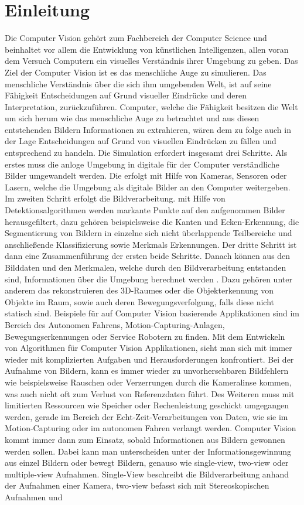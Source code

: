 \chapter{Einleitung}
\label{sec:einleitung} 



Die Computer Vision gehört zum Fachbereich der Computer Science und beinhaltet vor allem die Entwicklung von künstlichen Intelligenzen, allen voran dem Versuch Computern ein visuelles Verständnis ihrer Umgebung zu geben. Das Ziel der Computer Vision ist es das menschliche Auge zu simulieren. Das menschliche Verständnis über die sich ihm umgebenden Welt, ist auf seine Fähigkeit Entscheidungen auf Grund visueller Eindrücke und deren Interpretation, zurückzuführen. Computer, welche die Fähigkeit besitzen die Welt um sich herum wie das menschliche Auge zu betrachtet und aus diesen entstehenden Bildern Informationen zu extrahieren, wären dem zu folge auch in der Lage Entscheidungen auf Grund von visuellen Eindrücken zu fällen und entsprechend zu handeln\cite{ComputerVision}. Die Simulation erfordert insgesamt drei Schritte. Als erstes muss die anloge Umgebung in digitale für der Computer verständliche Bilder umgewandelt werden. Die erfolgt mit Hilfe von Kameras, Sensoren oder Lasern, welche die Umgebung als digitale Bilder an den Computer weitergeben. Im zweiten Schritt erfolgt die Bildverarbeitung. mit Hilfe von Detektionsalgorithmen werden markante Punkte auf den aufgenommen Bilder herausgefiltert, dazu gehören beispielsweise die Kanten und Ecken-Erkennung, die Segmentierung von Bildern in einzelne sich nicht überlappende Teilbereiche und anschließende Klassifizierung sowie Merkmals Erkennungen. Der dritte Schritt ist dann eine Zusammenführung der ersten beide Schritte. Danach können aus den Bilddaten und den Merkmalen, welche durch den Bildverarbeitung entstanden sind, Informationen über die Umgebung berechnet werden \cite{ComputerVision}. Dazu gehören unter anderem das rekonstruieren des 3D-Raumes oder die Objekterkennung von Objekte im Raum, sowie auch deren Bewegungsverfolgung, falls diese nicht statisch sind. Beispiele für auf Computer Vision basierende Applikationen sind im Bereich des Autonomen Fahrens, Motion-Capturing-Anlagen, Bewegungserkennungen oder Service Robotern zu finden. Mit dem Entwickeln von Algorithmen für Computer Vision Applikationen, sieht man sich mit immer wieder mit komplizierten Aufgaben und Herausforderungen konfrontiert. Bei der Aufnahme von Bildern, kann es immer wieder zu unvorhersehbaren Bildfehlern wie beispielsweise Rauschen oder Verzerrungen durch die Kameralinse kommen, was auch nicht oft zum Verlust von Referenzdaten führt. Des Weiteren muss mit limitierten Ressourcen wie Speicher oder Rechenleistung geschickt umgegangen werden, gerade im Bereich der Echt-Zeit-Verarbeitungen von Daten, wie sie im Motion-Capturing oder im autonomen Fahren verlangt werden. Computer Vision kommt immer dann zum Einsatz, sobald Informationen aus Bildern gewonnen werden sollen. Dabei kann man unterscheiden unter der Informationsgewinnung aus einzel Bildern oder bewegt Bildern, genauso wie single-view, two-view oder multiple-view Aufnahmen. Single-View beschreibt die Bildverarbeitung anhand der Aufnahmen einer Kamera, two-view befasst sich mit Stereoskopischen Aufnahmen und 